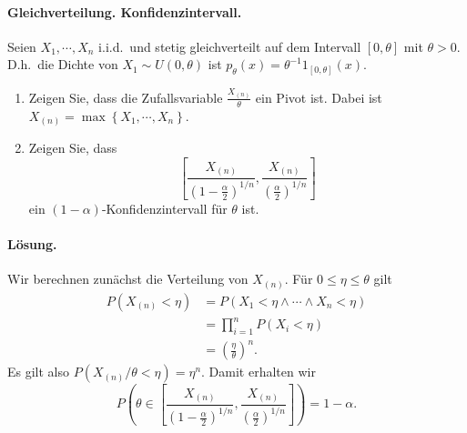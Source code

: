 \paragraph{Gleichverteilung. Konfidenzintervall.} Seien $X_1, \cdots, X_n$
i.i.d.\ und stetig gleichverteilt auf dem Intervall $\left[ 0,\theta \right]$
mit $\theta>0$. D.h.\  die Dichte von $X_1\sim U(0,\theta)$ ist $p_\theta(x) = \theta^{-1}
1_{\left[ 0,\theta \right]}(x)$.
\begin{enumerate}
    \item Zeigen Sie, dass die Zufallsvariable $\frac{X_{\left( n \right)}}{\theta}$ ein
        Pivot ist. Dabei ist $X_{\left( n \right)} = \max \left\{ X_1, \cdots, X_n \right\}$. 
    \item Zeigen Sie, dass 
        \begin{equation*}
            \left[ \frac{X_{\left( n \right)}}{ \left( 1- \frac{\alpha}{2} \right)^{1/n}},
            \frac{X_{\left( n \right)}}{ \left( \frac{\alpha}{2} \right)^{1/n}}
            \right]
        \end{equation*}
        ein $(1-\alpha)$-Konfidenzintervall für $\theta$ ist. 
\end{enumerate}

\paragraph*{Lösung.} Wir berechnen zunächst die Verteilung von $X_{(n)}$. Für $0 \leq \eta \leq \theta$
gilt
\begin{align*}
    P\left( X_{(n)} < \eta \right) &= P \left( X_1 < \eta \wedge \cdots \wedge X_n < \eta \right) \\
    &= \prod_{i=1}^{n} P \left( X_i < \eta \right) \\
    &= \left( \frac{\eta}{\theta} \right)^n.
\end{align*}
Es gilt also $P \left( X_{(n)}/\theta < \eta \right) = \eta^{n}$. Damit erhalten wir 
\begin{equation*}
    P \left( \theta \in 
        \left[ \frac{X_{\left( n \right)}}{ \left( 1- \frac{\alpha}{2} \right)^{1/n}},
            \frac{X_{\left( n \right)}}{ \left( \frac{\alpha}{2} \right)^{1/n}}
        \right]
    \right) = 1 - \alpha.
\end{equation*}








